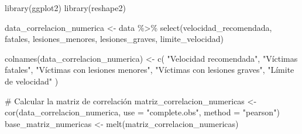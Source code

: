 \documentclass[
  letterpaper,
  DIV=11,
  numbers=noendperiod]{scrartcl}
\newenvironment{Shaded}{\begin{snugshade}}{\end{snugshade}}
\newcommand{\AttributeTok}[1]{\textcolor[rgb]{0.40,0.45,0.13}{#1}}
\newcommand{\CommentTok}[1]{\textcolor[rgb]{0.37,0.37,0.37}{#1}}
\newcommand{\FunctionTok}[1]{\textcolor[rgb]{0.28,0.35,0.67}{#1}}
\newcommand{\NormalTok}[1]{\textcolor[rgb]{0.00,0.23,0.31}{#1}}
\newcommand{\OtherTok}[1]{\textcolor[rgb]{0.00,0.23,0.31}{#1}}
\newcommand{\SpecialCharTok}[1]{\textcolor[rgb]{0.37,0.37,0.37}{#1}}
\newcommand{\StringTok}[1]{\textcolor[rgb]{0.13,0.47,0.30}{#1}}
\begin{document}
\begin{Shaded}
\begin{Highlighting}[]
\FunctionTok{library}\NormalTok{(ggplot2)}
\FunctionTok{library}\NormalTok{(reshape2)}

\NormalTok{data\_correlacion\_numerica }\OtherTok{\textless{}{-}}\NormalTok{ data }\SpecialCharTok{\%\textgreater{}\%}
  \FunctionTok{select}\NormalTok{(velocidad\_recomendada, fatales, lesiones\_menores, lesiones\_graves, limite\_velocidad)}


\FunctionTok{colnames}\NormalTok{(data\_correlacion\_numerica) }\OtherTok{\textless{}{-}} \FunctionTok{c}\NormalTok{(}
  \StringTok{"Velocidad recomendada"}\NormalTok{, }\StringTok{"Víctimas fatales"}\NormalTok{, }\StringTok{"Víctimas con lesiones menores"}\NormalTok{, }\StringTok{"Víctimas con lesiones graves"}\NormalTok{, }\StringTok{"Límite de velocidad"}
\NormalTok{)}

\CommentTok{\# Calcular la matriz de correlación}
\NormalTok{matriz\_correlacion\_numericas }\OtherTok{\textless{}{-}} \FunctionTok{cor}\NormalTok{(data\_correlacion\_numerica, }\AttributeTok{use =} \StringTok{"complete.obs"}\NormalTok{, }\AttributeTok{method =} \StringTok{"pearson"}\NormalTok{)}
\NormalTok{base\_matriz\_numericas }\OtherTok{\textless{}{-}} \FunctionTok{melt}\NormalTok{(matriz\_correlacion\_numericas)}


\end{Highlighting}
\end{Shaded}
\end{document}
